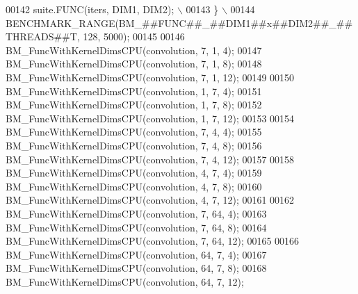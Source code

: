 \begin{DoxyCode}
00142 \textcolor{preprocessor}{    suite.FUNC(iters, DIM1, DIM2);                                             \(\backslash\)}
00143 \textcolor{preprocessor}{  \}                                                                            \(\backslash\)}
00144 \textcolor{preprocessor}{  BENCHMARK\_RANGE(BM\_##FUNC##\_##DIM1##x##DIM2##\_##THREADS##T, 128, 5000);}
00145 
00146 BM\_FuncWithKernelDimsCPU(convolution, 7, 1, 4);
00147 BM\_FuncWithKernelDimsCPU(convolution, 7, 1, 8);
00148 BM\_FuncWithKernelDimsCPU(convolution, 7, 1, 12);
00149 
00150 BM\_FuncWithKernelDimsCPU(convolution, 1, 7, 4);
00151 BM\_FuncWithKernelDimsCPU(convolution, 1, 7, 8);
00152 BM\_FuncWithKernelDimsCPU(convolution, 1, 7, 12);
00153 
00154 BM\_FuncWithKernelDimsCPU(convolution, 7, 4, 4);
00155 BM\_FuncWithKernelDimsCPU(convolution, 7, 4, 8);
00156 BM\_FuncWithKernelDimsCPU(convolution, 7, 4, 12);
00157 
00158 BM\_FuncWithKernelDimsCPU(convolution, 4, 7, 4);
00159 BM\_FuncWithKernelDimsCPU(convolution, 4, 7, 8);
00160 BM\_FuncWithKernelDimsCPU(convolution, 4, 7, 12);
00161 
00162 BM\_FuncWithKernelDimsCPU(convolution, 7, 64, 4);
00163 BM\_FuncWithKernelDimsCPU(convolution, 7, 64, 8);
00164 BM\_FuncWithKernelDimsCPU(convolution, 7, 64, 12);
00165 
00166 BM\_FuncWithKernelDimsCPU(convolution, 64, 7, 4);
00167 BM\_FuncWithKernelDimsCPU(convolution, 64, 7, 8);
00168 BM\_FuncWithKernelDimsCPU(convolution, 64, 7, 12);
\end{DoxyCode}
